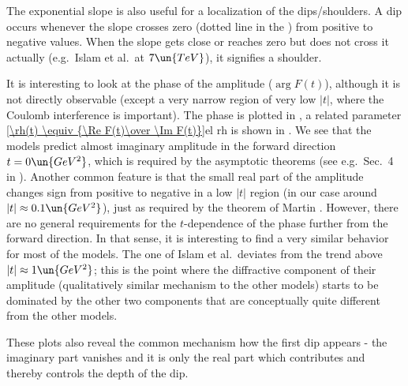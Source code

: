 The exponential slope is also useful for a localization of the dips/shoulders. A dip occurs whenever the slope crosses zero (dotted line in the ) from positive to negative values. When the slope gets close or reaches zero but does not cross it actually (e.g.~Islam et al.\ at $7\un{TeV}$), it signifies a shoulder.


It is interesting to look at the phase of the amplitude ($\arg F(t)$), although it is not directly observable (except a very narrow region of very low $|t|$, where the Coulomb interference is important). The phase is plotted in , a related parameter 
\eqref{\rh(t) \equiv {\Re F(t)\over \Im F(t)}}{el rh}
is shown in . We see that the models predict almost imaginary amplitude in the forward direction $t=0\un{GeV^2}$, which is required by the asymptotic theorems (see e.g.~Sec.~4 in ). Another common feature is that the small real part of the amplitude changes sign from positive to negative in a low $|t|$ region (in our case around $|t| \approx 0.1\un{GeV^2}$), just as required by the theorem of Martin . However, there are no general requirements for the $t$-dependence of the phase further from the forward direction. In that sense, it is interesting to find a very similar behavior for most of the models. The one of Islam et al.\ deviates from the trend above $|t|\approx 1\un{GeV^2}$; this is the point where the diffractive component of their amplitude (qualitatively similar mechanism to the other models) starts to be dominated by the other two components that are conceptually quite different from the other models.


These plots also reveal the common mechanism how the first dip appears - the imaginary part vanishes and it is only the real part which contributes and thereby controls the depth of the dip.



